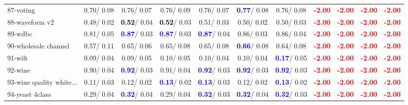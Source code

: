\begin{table}[h]
\begin{center}
{\begin{tabular}{lc|c|c|c|c|c|c|c|c|c}
87-voting &   0.70/  0.08 &   0.76/  0.07 &   0.76/  0.09 &   0.76/  0.07 & \textcolor{blue}{\textbf{  0.77}}/  0.08 &   0.76/  0.08 & \textcolor{red}{\textbf{ -2.00}} & \textcolor{red}{\textbf{ -2.00}} & \textcolor{red}{\textbf{ -2.00}} & \textcolor{red}{\textbf{ -2.00}} \\
88-waveform v2 &   0.48/  0.02 & \textcolor{black}{\textbf{  0.52}}/  0.04 & \textcolor{black}{\textbf{  0.52}}/  0.03 &   0.51/  0.03 &   0.50/  0.02 &   0.50/  0.03 & \textcolor{red}{\textbf{ -2.00}} & \textcolor{red}{\textbf{ -2.00}} & \textcolor{red}{\textbf{ -2.00}} & \textcolor{red}{\textbf{ -2.00}} \\
89-wdbc &   0.81/  0.05 & \textcolor{blue}{\textbf{  0.87}}/  0.03 & \textcolor{blue}{\textbf{  0.87}}/  0.03 & \textcolor{blue}{\textbf{  0.87}}/  0.04 &   0.86/  0.03 &   0.86/  0.04 & \textcolor{red}{\textbf{ -2.00}} & \textcolor{red}{\textbf{ -2.00}} & \textcolor{red}{\textbf{ -2.00}} & \textcolor{red}{\textbf{ -2.00}} \\
90-wholesale channel &   0.57/  0.11 &   0.65/  0.06 &   0.65/  0.08 &   0.65/  0.08 & \textcolor{blue}{\textbf{  0.66}}/  0.08 &   0.64/  0.08 & \textcolor{red}{\textbf{ -2.00}} & \textcolor{red}{\textbf{ -2.00}} & \textcolor{red}{\textbf{ -2.00}} & \textcolor{red}{\textbf{ -2.00}} \\
91-wilt &   0.09/  0.04 &   0.09/  0.05 &   0.10/  0.05 &   0.10/  0.04 &   0.10/  0.04 & \textcolor{blue}{\textbf{  0.17}}/  0.05 & \textcolor{red}{\textbf{ -2.00}} & \textcolor{red}{\textbf{ -2.00}} & \textcolor{red}{\textbf{ -2.00}} & \textcolor{red}{\textbf{ -2.00}} \\
92-wine &   0.90/  0.04 & \textcolor{blue}{\textbf{  0.92}}/  0.03 &   0.91/  0.04 & \textcolor{blue}{\textbf{  0.92}}/  0.03 & \textcolor{blue}{\textbf{  0.92}}/  0.03 & \textcolor{blue}{\textbf{  0.92}}/  0.03 & \textcolor{red}{\textbf{ -2.00}} & \textcolor{red}{\textbf{ -2.00}} & \textcolor{red}{\textbf{ -2.00}} & \textcolor{red}{\textbf{ -2.00}} \\ \hline
93-wine quality white... &   0.11/  0.03 &   0.12/  0.02 & \textcolor{blue}{\textbf{  0.13}}/  0.02 & \textcolor{blue}{\textbf{  0.13}}/  0.03 &   0.12/  0.02 & \textcolor{blue}{\textbf{  0.13}}/  0.02 & \textcolor{red}{\textbf{ -2.00}} & \textcolor{red}{\textbf{ -2.00}} & \textcolor{red}{\textbf{ -2.00}} & \textcolor{red}{\textbf{ -2.00}} \\
94-yeast 4class &   0.29/  0.04 & \textcolor{blue}{\textbf{  0.32}}/  0.04 &   0.29/  0.04 & \textcolor{blue}{\textbf{  0.32}}/  0.03 & \textcolor{blue}{\textbf{  0.32}}/  0.04 & \textcolor{blue}{\textbf{  0.32}}/  0.03 & \textcolor{red}{\textbf{ -2.00}} & \textcolor{red}{\textbf{ -2.00}} & \textcolor{red}{\textbf{ -2.00}} & \textcolor{red}{\textbf{ -2.00}} \\\end{tabular}}\label{stratsALCKappa2b5NNaRedux}
\end{center}
\end{table}